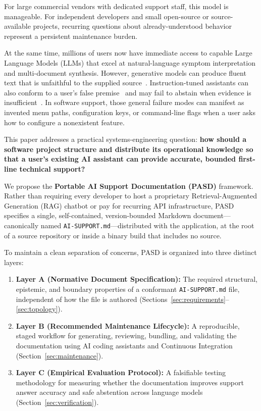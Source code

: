 \documentclass[12pt, a4paper]{article}
\begin{document}
For large commercial vendors with dedicated support staff, this model is manageable. For independent developers and small open-source or source-available projects, recurring questions about already-understood behavior represent a persistent maintenance burden.

At the same time, millions of users now have immediate access to capable Large Language Models (LLMs) that excel at natural-language symptom interpretation and multi-document synthesis. However, generative models can produce fluent text that is unfaithful to the supplied source~\citep{ji2023survey}. Instruction-tuned assistants can also conform to a user's false premise~\citep{sharma2023sycophancy} and may fail to abstain when evidence is insufficient~\citep{wen2025know}. In software support, those general failure modes can manifest as invented menu paths, configuration keys, or command-line flags when a user asks how to configure a nonexistent feature.

This paper addresses a practical systems-engineering question: \textbf{how should a software project structure and distribute its operational knowledge so that a user's existing AI assistant can provide accurate, bounded first-line technical support?}

We propose the \textbf{Portable AI Support Documentation (PASD)} framework. Rather than requiring every developer to host a proprietary Retrieval-Augmented Generation (RAG) chatbot or pay for recurring API infrastructure, PASD specifies a single, self-contained, version-bounded Markdown document---canonically named \texttt{AI-SUPPORT.md}---distributed with the application, at the root of a source repository or inside a binary build that includes no source. 

To maintain a clean separation of concerns, PASD is organized into three distinct layers:
\begin{enumerate}
    \item \textbf{Layer A (Normative Document Specification):} The required structural, epistemic, and boundary properties of a conformant \texttt{AI-SUPPORT.md} file, independent of how the file is authored (Sections~\ref{sec:requirements}--\ref{sec:topology}).
    \item \textbf{Layer B (Recommended Maintenance Lifecycle):} A reproducible, staged workflow for generating, reviewing, bundling, and validating the documentation using AI coding assistants and Continuous Integration (Section~\ref{sec:maintenance}).
    \item \textbf{Layer C (Empirical Evaluation Protocol):} A falsifiable testing methodology for measuring whether the documentation improves support answer accuracy and safe abstention across language models (Section~\ref{sec:verification}).
\end{enumerate}
\end{document}
